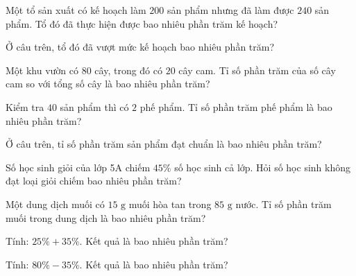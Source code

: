\begin{ex}
  Một tổ sản xuất có kế hoạch làm $200$ sản phẩm nhưng đã làm được $240$ sản phẩm. Tổ đó đã thực hiện được bao nhiêu phần trăm kế hoạch?
\end{ex}

\begin{ex}
  Ở câu trên, tổ đó đã vượt mức kế hoạch bao nhiêu phần trăm?
\end{ex}

\begin{ex}
  Một khu vườn có $80$ cây, trong đó có $20$ cây cam. Tỉ số phần trăm của số cây cam so với tổng số cây là bao nhiêu phần trăm?
\end{ex}

\begin{ex}
  Kiểm tra $40$ sản phẩm thì có $2$ phế phẩm. Tỉ số phần trăm phế phẩm là bao nhiêu phần trăm?
\end{ex}

\begin{ex}
  Ở câu trên, tỉ số phần trăm sản phẩm đạt chuẩn là bao nhiêu phần trăm?
\end{ex}

\begin{ex}
  Số học sinh giỏi của lớp 5A chiếm $45\%$ số học sinh cả lớp. Hỏi số học sinh không đạt loại giỏi chiếm bao nhiêu phần trăm?
\end{ex}

\begin{ex}
  Một dung dịch muối có $15\text{ g}$ muối hòa tan trong $85\text{ g}$ nước. Tỉ số phần trăm muối trong dung dịch là bao nhiêu phần trăm?
\end{ex}

\begin{ex}
  Tính: $25\% + 35\%$. Kết quả là bao nhiêu phần trăm?
\end{ex}

\begin{ex}
  Tính: $80\% - 35\%$. Kết quả là bao nhiêu phần trăm?
\end{ex}

